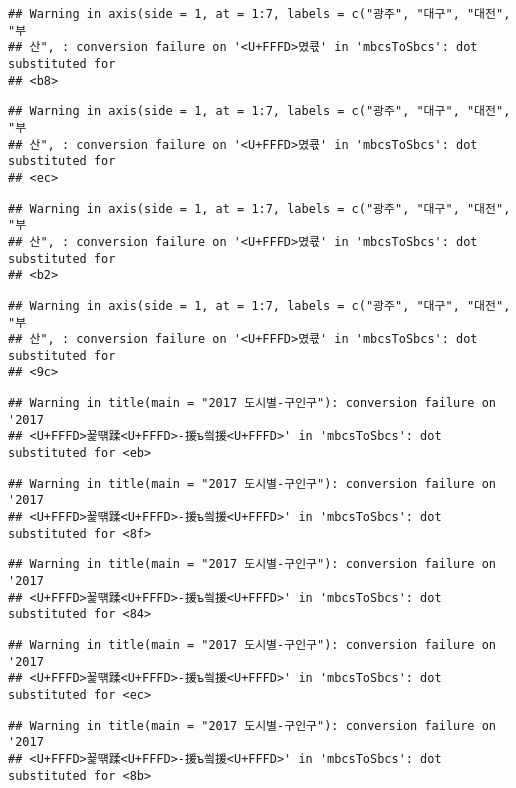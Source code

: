 \documentclass[]{article}
\begin{document}
\begin{verbatim}
## Warning in axis(side = 1, at = 1:7, labels = c("광주", "대구", "대전", "부
## 산", : conversion failure on '<U+FFFD>몄쿇' in 'mbcsToSbcs': dot substituted for
## <b8>
\end{verbatim}

\begin{verbatim}
## Warning in axis(side = 1, at = 1:7, labels = c("광주", "대구", "대전", "부
## 산", : conversion failure on '<U+FFFD>몄쿇' in 'mbcsToSbcs': dot substituted for
## <ec>
\end{verbatim}

\begin{verbatim}
## Warning in axis(side = 1, at = 1:7, labels = c("광주", "대구", "대전", "부
## 산", : conversion failure on '<U+FFFD>몄쿇' in 'mbcsToSbcs': dot substituted for
## <b2>
\end{verbatim}

\begin{verbatim}
## Warning in axis(side = 1, at = 1:7, labels = c("광주", "대구", "대전", "부
## 산", : conversion failure on '<U+FFFD>몄쿇' in 'mbcsToSbcs': dot substituted for
## <9c>
\end{verbatim}

\begin{verbatim}
## Warning in title(main = "2017 도시별-구인구"): conversion failure on '2017
## <U+FFFD>꾩떆蹂<U+FFFD>-援ъ씤援<U+FFFD>' in 'mbcsToSbcs': dot substituted for <eb>
\end{verbatim}

\begin{verbatim}
## Warning in title(main = "2017 도시별-구인구"): conversion failure on '2017
## <U+FFFD>꾩떆蹂<U+FFFD>-援ъ씤援<U+FFFD>' in 'mbcsToSbcs': dot substituted for <8f>
\end{verbatim}

\begin{verbatim}
## Warning in title(main = "2017 도시별-구인구"): conversion failure on '2017
## <U+FFFD>꾩떆蹂<U+FFFD>-援ъ씤援<U+FFFD>' in 'mbcsToSbcs': dot substituted for <84>
\end{verbatim}

\begin{verbatim}
## Warning in title(main = "2017 도시별-구인구"): conversion failure on '2017
## <U+FFFD>꾩떆蹂<U+FFFD>-援ъ씤援<U+FFFD>' in 'mbcsToSbcs': dot substituted for <ec>
\end{verbatim}

\begin{verbatim}
## Warning in title(main = "2017 도시별-구인구"): conversion failure on '2017
## <U+FFFD>꾩떆蹂<U+FFFD>-援ъ씤援<U+FFFD>' in 'mbcsToSbcs': dot substituted for <8b>
\end{verbatim}
\end{document}
